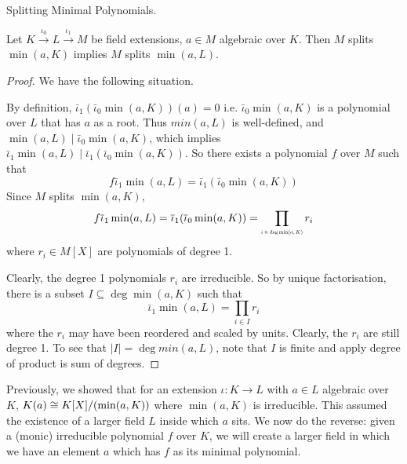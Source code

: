 \documentclass[../book.tex]{subfiles}
\begin{document}
\begin{lem} Splitting Minimal Polynomials.
    
    Let $K \overset{\iota_0}{\to} L \overset{\iota_1}{\to} M$ be field extensions,
    $a \in M$ algebraic over $K$. 
    Then $M$ splits $\min(a,K)$ implies $M$ splits $\min(a,L)$.
\end{lem}
\begin{proof}
    We have the following situation. 
    \begin{figure} [H]
        \centering
    \end{figure}
    By definition, $\bar\iota_1 (\bar\iota_0 \min(a,K))(a)=0$ i.e. 
    $\bar\iota_0 \min(a,K)$ is a polynomial over $L$ that has $a$ as a root. 
    Thus $min(a,L)$ is well-defined,
    and $\min(a,L) \mid \bar\iota_0 \min(a, K)$,
    which implies $\bar\iota_1 \min(a,L) \mid \bar\iota_1 (\bar\iota_0 \min(a,K))$.
    So there exists a polynomial $f$ over $M$ such that \[
        f \bar\iota_1 \min(a,L) = \bar\iota_1(\bar\iota_0 \min(a,K))
    \]
    Since $M$ splits $\min(a,K)$, \[
        f \bar\iota_1 \min(a,L) =
        \bar\iota_1(\bar\iota_0 \min(a,K)) = \prod_{\tiny{i \in \deg\min(a,K)}} r_i
    \]
    where $r_i \in M[X]$ are polynomials of degree 1. 
    
    Clearly, the degree 1 polynomials $r_i$ are irreducible. 
    So by unique factorisation, there is a subset $I \subseteq \deg\min(a,K)$
    such that \[
        \bar\iota_1 \min(a,L) = \prod_{i \in I} r_i
    \]
    where the $r_i$ may have been reordered and scaled by units.
    Clearly, the $r_i$ are still degree 1. 
    To see that $|I| = \deg min(a,L)$, note that $I$ is finite and apply
    degree of product is sum of degrees. 
\end{proof}
\begin{rmk}
    Previously, we showed that for an extension $\iota : K \to L$ with 
    $a \in L$ algebraic over $K$, 
    $K(a) \cong K[X]/(\min(a,K))$ where $\min(a,K)$ is irreducible.
    This assumed the existence of a larger field $L$ inside which $a$ sits. 
    We now do the reverse: 
    given a (monic) irreducible polynomial $f$ over $K$, 
    we will create a larger field in which 
    we have an element $a$ which has $f$ as its minimal polynomial. 
\end{rmk}
\end{document}

